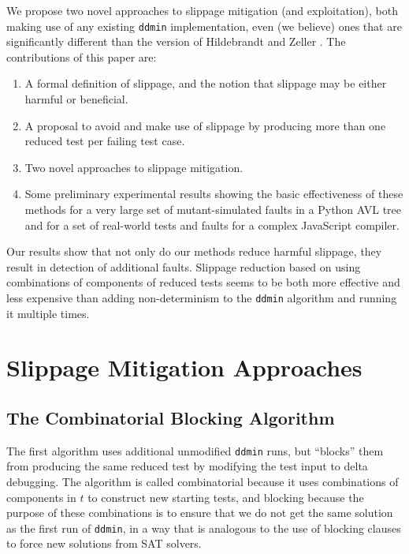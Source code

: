 We
propose two novel approaches to slippage mitigation (and
exploitation), both making use of any existing {\tt ddmin}
implementation, even (we believe) ones that are significantly different than the
version of Hildebrandt and Zeller \cite{DD}.  The contributions of this paper are:

\begin{enumerate}
\item A formal definition of slippage, and the notion that slippage
  may be either harmful or beneficial.
\item A proposal to avoid and make use of slippage by producing more
  than one reduced test per failing test case.
\item Two novel approaches to slippage mitigation.
\item Some preliminary experimental results showing the basic effectiveness of these
  methods for a very large set of mutant-simulated faults in a Python
  AVL tree and for a set of real-world tests and faults for a complex
  JavaScript compiler.
\end{enumerate}

Our results show that not only do our methods reduce harmful slippage,
they result in detection of additional faults.  Slippage reduction
based on using combinations of components of reduced tests seems to be
both more effective and less expensive than adding non-determinism to
the {\tt ddmin} algorithm and running it multiple times.

\section{Slippage Mitigation Approaches}

\subsection{The Combinatorial Blocking Algorithm}

The first algorithm uses additional unmodified {\tt ddmin} runs, but
``blocks'' them from producing the same reduced test by modifying the
test input to delta debugging.  The algorithm is called combinatorial
because it uses combinations of components in $t$ to construct new
starting tests, and blocking because the purpose of these combinations
is to ensure that we do not get the same solution as the first run of
{\tt ddmin}, in a way that is analogous to the use of blocking clauses
to force new solutions from SAT solvers.

